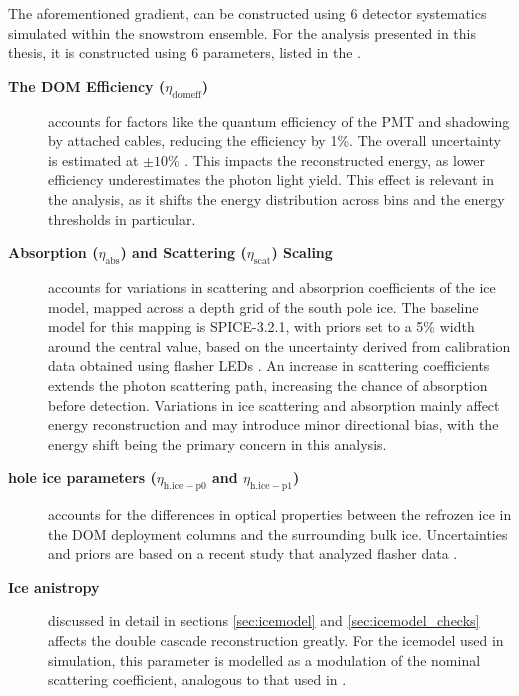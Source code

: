 The aforementioned gradient, can be constructed using 6 detector systematics simulated within the snowstrom ensemble. For the analysis presented in this thesis, it is constructed using 6 parameters, listed in the . 
\begin{description}
    \item [\textbf{The DOM Efficiency ($\eta_{\mathrm{domeff}}$)}] accounts for factors like the quantum efficiency of the PMT and shadowing by attached cables, reducing the efficiency by 1\%. The overall uncertainty is estimated at $\pm10\%$ . This impacts the reconstructed energy, as lower efficiency underestimates the photon light yield. This effect is relevant in the analysis, as it shifts the energy distribution across bins and the energy thresholds in particular.
    \item [\textbf{Absorption ($\eta_{\mathrm{abs}}$) and Scattering ($\eta_{\mathrm{scat}}$) Scaling}] accounts for variations in scattering and absorprion coefficients of the ice model, mapped across a depth grid of the south pole ice. The baseline model for this mapping is SPICE-3.2.1, with priors set to a 5\% width around the central value, based on the uncertainty derived from calibration data obtained using flasher LEDs \cite{spicemie}. An increase in scattering coefficients extends the photon scattering path, increasing the chance of absorption before detection. Variations in ice scattering and absorption mainly affect energy reconstruction and may introduce minor directional bias, with the energy shift being the primary concern in this analysis.  
    \item [\textbf{hole ice parameters ($\eta_{\mathrm{h.ice-p0}}$ and $\eta_{\mathrm{h.ice-p1}}$)}] accounts for the differences in optical properties between the refrozen ice in the DOM deployment columns and the surrounding bulk ice. Uncertainties and priors are based on a recent study that analyzed flasher data .
    \item [\textbf{Ice anistropy}] discussed in detail in sections \ref{sec:icemodel} and \ref{sec:icemodel_checks} affects the double cascade reconstruction greatly. For the icemodel used in simulation, this parameter is modelled as a modulation of the nominal scattering coefficient, analogous to that used in .
\end{description}



